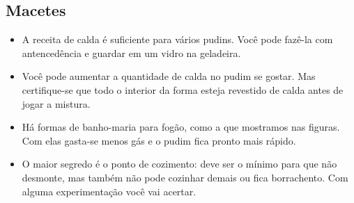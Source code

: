 \subsection{Macetes}
\begin{itemize}
\item A receita de calda é suficiente para vários pudins. Você pode fazê-la com antencedência e guardar em um vidro na geladeira.
\item Você pode aumentar a quantidade de calda no pudim se gostar. Mas certifique-se que todo o interior da forma esteja revestido de calda antes de jogar a mistura.
\item Há formas de banho-maria para fogão, como a que mostramos nas figuras. Com elas gasta-se menos gás e o pudim fica pronto mais rápido. 
\item O maior segredo é o ponto de cozimento: deve ser o mínimo para que não desmonte, mas também não pode cozinhar demais ou fica borrachento. Com alguma experimentação você vai acertar.
\end{itemize}
